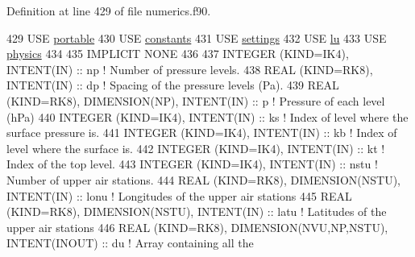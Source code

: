 Definition at line 429 of file numerics.\+f90.


\begin{DoxyCode}
429 \textcolor{keywordtype}{USE }\hyperlink{namespaceportable}{portable}
430 \textcolor{keywordtype}{USE }\hyperlink{namespaceconstants}{constants}
431 \textcolor{keywordtype}{USE }\hyperlink{namespacesettings}{settings}
432 \textcolor{keywordtype}{USE }\hyperlink{namespacelu}{lu}
433 \textcolor{keywordtype}{USE }\hyperlink{namespacephysics}{physics}
434 
435 \textcolor{keywordtype}{IMPLICIT NONE}
436 
437 \textcolor{keywordtype}{INTEGER (KIND=IK4)}, \textcolor{keywordtype}{INTENT(IN)}                                      :: np       \textcolor{comment}{! Number of pressure
       levels.}
438 \textcolor{keywordtype}{REAL (KIND=RK8)}, \textcolor{keywordtype}{INTENT(IN)}                                         :: dp       \textcolor{comment}{! Spacing of the pressure
       levels (Pa).}
439 \textcolor{keywordtype}{REAL (KIND=RK8)}, \textcolor{keywordtype}{DIMENSION(NP)}, \textcolor{keywordtype}{INTENT(IN)}                          :: p        \textcolor{comment}{! Pressure of each level
       (hPa)}
440 \textcolor{keywordtype}{INTEGER (KIND=IK4)}, \textcolor{keywordtype}{INTENT(IN)}                                      :: ks       \textcolor{comment}{! Index of level where the
       surface pressure is.}
441 \textcolor{keywordtype}{INTEGER (KIND=IK4)}, \textcolor{keywordtype}{INTENT(IN)}                                      :: kb       \textcolor{comment}{! Index of level where the
       surface is.}
442 \textcolor{keywordtype}{INTEGER (KIND=IK4)}, \textcolor{keywordtype}{INTENT(IN)}                                      :: kt       \textcolor{comment}{! Index of the top level.}
443 \textcolor{keywordtype}{INTEGER (KIND=IK4)}, \textcolor{keywordtype}{INTENT(IN)}                                      :: nstu     \textcolor{comment}{! Number of upper air
       stations.}
444 \textcolor{keywordtype}{REAL (KIND=RK8)}, \textcolor{keywordtype}{DIMENSION(NSTU)}, \textcolor{keywordtype}{INTENT(IN)}                        :: lonu     \textcolor{comment}{! Longitudes of the upper
       air stations}
445 \textcolor{keywordtype}{REAL (KIND=RK8)}, \textcolor{keywordtype}{DIMENSION(NSTU)}, \textcolor{keywordtype}{INTENT(IN)}                        :: latu     \textcolor{comment}{! Latitudes of the upper
       air stations}
446 \textcolor{keywordtype}{REAL (KIND=RK8)}, \textcolor{keywordtype}{DIMENSION(NVU,NP,NSTU)}, \textcolor{keywordtype}{INTENT(INOUT)}              :: du       \textcolor{comment}{! Array containing all the
}
\end{DoxyCode}
